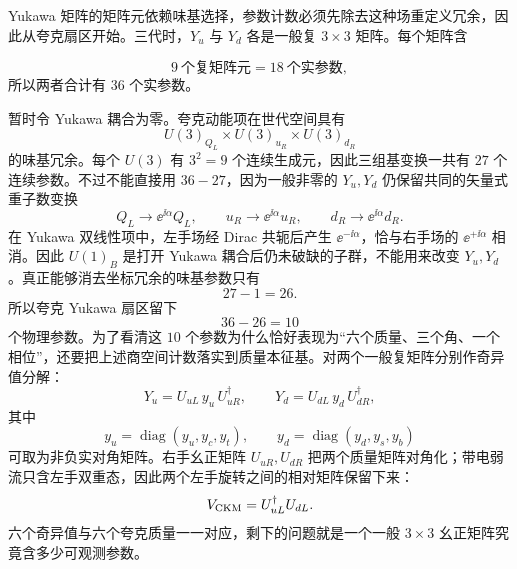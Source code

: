 \begin{derivation}[场重定义后的独立物理参数]
Yukawa 矩阵的矩阵元依赖味基选择，参数计数必须先除去这种场重定义冗余，因此从夸克扇区开始。三代时，$Y_u$ 与 $Y_d$ 各是一般复 $3\times3$ 矩阵。每个矩阵含

\begin{equation*}
 9\ \text{个复矩阵元}
 =18\ \text{个实参数},
\end{equation*}
所以两者合计有 $36$ 个实参数。

暂时令 Yukawa 耦合为零。夸克动能项在世代空间具有
\begin{equation*}
 U(3)_{Q_L}\times U(3)_{u_R}\times U(3)_{d_R}
\end{equation*}
的味基冗余。每个 $U(3)$ 有 $3^2=9$ 个连续生成元，因此三组基变换一共有 $27$ 个连续参数。不过不能直接用 $36-27$，因为一般非零的 $Y_u,Y_d$ 仍保留共同的矢量式重子数变换
\begin{equation*}
 Q_L\to \ee^{\ii\alpha}Q_L,
 \qquad
 u_R\to \ee^{\ii\alpha}u_R,
 \qquad
 d_R\to \ee^{\ii\alpha}d_R.
\end{equation*}
在 Yukawa 双线性项中，左手场经 Dirac 共轭后产生 $\ee^{-\ii\alpha}$，恰与右手场的 $\ee^{+\ii\alpha}$ 相消。因此 $U(1)_B$ 是打开 Yukawa 耦合后仍未破缺的子群，不能用来改变 $Y_u,Y_d$。真正能够消去坐标冗余的味基参数只有
\begin{equation*}
 27-1=26.
\end{equation*}
所以夸克 Yukawa 扇区留下
\begin{equation*}
 36-26=10
\end{equation*}
个物理参数。为了看清这 $10$ 个参数为什么恰好表现为“六个质量、三个角、一个相位”，还要把上述商空间计数落实到质量本征基。对两个一般复矩阵分别作奇异值分解：
\begin{equation*}
 Y_u=U_{uL}\,y_u\,U_{uR}^\dagger,
 \qquad
 Y_d=U_{dL}\,y_d\,U_{dR}^\dagger,
\end{equation*}
其中
\begin{equation*}
 y_u=\operatorname{diag}(y_u,y_c,y_t),
 \qquad
 y_d=\operatorname{diag}(y_d,y_s,y_b)
\end{equation*}
可取为非负实对角矩阵。右手幺正矩阵 $U_{uR},U_{dR}$ 把两个质量矩阵对角化；带电弱流只含左手双重态，因此两个左手旋转之间的相对矩阵保留下来：
\begin{equation*}
 V_{\rm CKM}=U_{uL}^\dagger U_{dL}.
\end{equation*}
六个奇异值与六个夸克质量一一对应，剩下的问题就是一个一般 $3\times3$ 幺正矩阵究竟含多少可观测参数。


\end{derivation}
